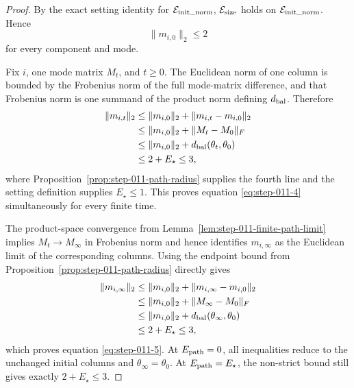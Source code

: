 \begin{proof}
By the exact setting identity for \(\mathcal E_{\rm init\_norm}\),
\(\mathcal E_{\rm size}\) holds on
\(\mathcal E_{\rm init\_norm}\). Hence
\[
  \|m_{i,0}\|_2\le2
\]
for every component and mode.

Fix \(i\), one mode matrix \(M_t\), and \(t\ge0\). The Euclidean norm of one
column is bounded by the Frobenius norm of the full mode-matrix difference,
and that Frobenius norm is one summand of the product norm defining
\(d_{\rm bal}\). Therefore
\[
\begin{aligned}
  \|m_{i,t}\|_2
  &\le \|m_{i,0}\|_2+\|m_{i,t}-m_{i,0}\|_2\\
  &\le \|m_{i,0}\|_2+\|M_t-M_0\|_F\\
  &\le \|m_{i,0}\|_2+d_{\rm bal}(\theta_t,\theta_0)\\
  &\le2+E_\star\le3,
\end{aligned}
\]
where Proposition~\ref{prop:step-011-path-radius} supplies the fourth line and
the setting definition supplies \(E_\star\le1\). This proves equation \eqref{eq:step-011-4}
simultaneously for every finite time.

The product-space convergence from
Lemma~\ref{lem:step-011-finite-path-limit} implies
\(M_t\to M_\infty\) in Frobenius norm and hence identifies
\(m_{i,\infty}\) as the Euclidean limit of the corresponding columns.
Using the endpoint bound from Proposition~\ref{prop:step-011-path-radius}
directly gives
\[
\begin{aligned}
  \|m_{i,\infty}\|_2
  &\le\|m_{i,0}\|_2+\|m_{i,\infty}-m_{i,0}\|_2\\
  &\le\|m_{i,0}\|_2+\|M_\infty-M_0\|_F\\
  &\le\|m_{i,0}\|_2+d_{\rm bal}(\theta_\infty,\theta_0)\\
  &\le2+E_\star\le3,
\end{aligned}
\]
which proves equation \eqref{eq:step-011-5}. At \(E_{\rm path}=0\), all inequalities reduce to
the unchanged initial columns and \(\theta_\infty=\theta_0\). At
\(E_{\rm path}=E_\star\), the non-strict bound still gives exactly
\(2+E_\star\le3\). 

\end{proof}

